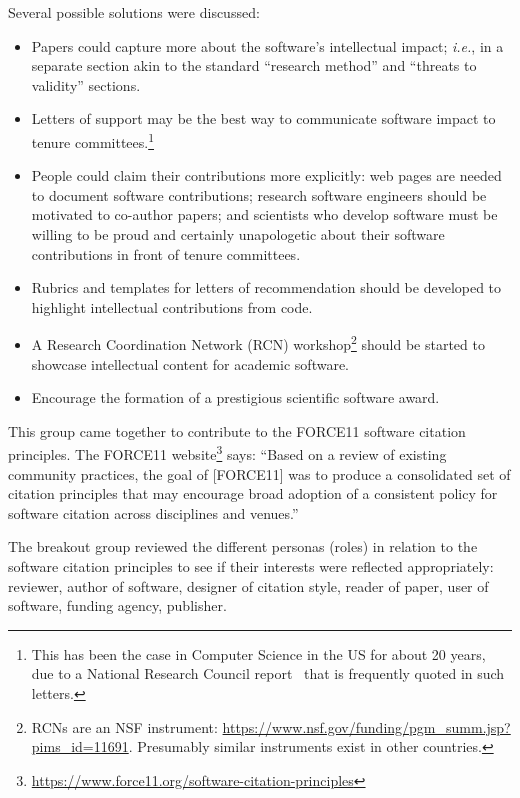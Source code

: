 \documentclass[a4paper,UKenglish]{dagrep}
\newcommand{\ie}{\emph{i.e.},\xspace}
\begin{document}
Several possible solutions were discussed: 
\begin{itemize}
	\item Papers could capture more about the software's intellectual impact; \ie in a separate section akin to the standard ``research method'' and ``threats to validity'' sections.
    \item Letters of support may be the best way to communicate software impact to tenure committees.\footnote{This has been the case in Computer Science in the US for about 20 years, due to a National Research Council report~\cite{NRC-CS-1994} that is frequently quoted in such letters.}
    \item People could claim their contributions more explicitly:
    	web pages are needed to document software contributions;
		research software engineers should be motivated to co-author papers;
		and scientists who develop software must be willing to be proud and certainly unapologetic about their software contributions in front of tenure committees. 
    \item Rubrics and templates for letters of recommendation should be developed to highlight intellectual contributions from code.
    \item A Research Coordination Network (RCN) workshop\footnote{RCNs are an NSF instrument: \url{https://www.nsf.gov/funding/pgm_summ.jsp?pims_id=11691}. Presumably similar instruments exist in other countries.} should be started to showcase intellectual content for academic software.
    \item Encourage the formation of a prestigious scientific software award. 
\end{itemize}


This group came together to contribute to the FORCE11 software citation principles. The FORCE11 website\footnote{\url{https://www.force11.org/software-citation-principles}} says: ``Based on a review of existing community practices, the goal of [FORCE11] was to produce a consolidated set of citation principles that may encourage broad adoption of a consistent policy for software citation across disciplines and venues.''

The breakout group reviewed the different personas (roles) in relation to the software citation principles to see if their interests were reflected appropriately: 
reviewer, author of software, designer of citation style, reader of paper, user of software, funding agency, publisher.
\end{document}
